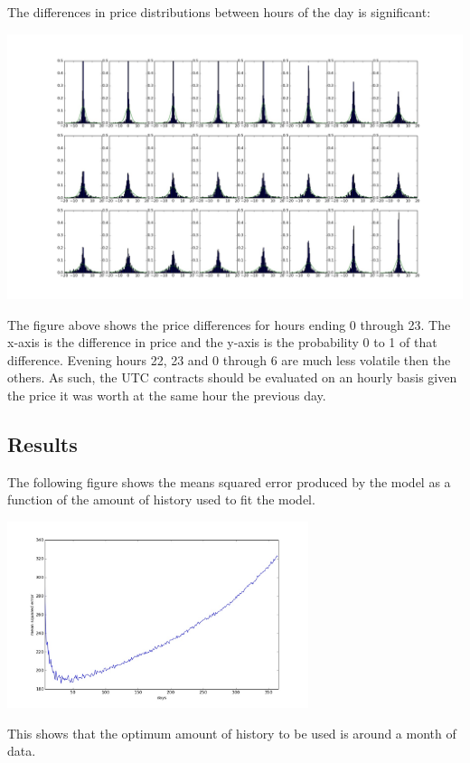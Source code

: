 \documentclass{report}
\begin{document}
The differences in price distributions between hours of the day is significant:
\begin{center}
\includegraphics[width=500pt, keepaspectratio=true]{hourly_distributions.jpg}
\end{center}
The figure above shows the price differences for hours ending 0 through 23. The x-axis
is the difference in price and the y-axis is the probability 0 to 1 of that difference.
Evening hours 22, 23 and 0 through 6 are much less volatile then the others. As such,
the UTC contracts should be evaluated on an hourly basis given the price it was
worth at the same hour the previous day.


\subsection*{Results}
The following figure shows the means squared error produced by the model as a
function of the amount of history used to fit the model.

\begin{center}
\includegraphics[width=250pt, keepaspectratio=true]{mean_squared_error.jpg}
\end{center}

This shows that the optimum amount of history to be used is around a month of data.
\end{document}
